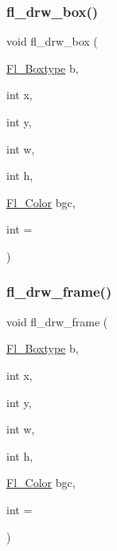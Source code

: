 \subsubsection{\texorpdfstring{fl\+\_\+drw\+\_\+box()}{fl\_drw\_box()}}
{\footnotesize\ttfamily void fl\+\_\+drw\+\_\+box (\begin{DoxyParamCaption}\item[{\hyperlink{_enumerations_8_h_ae48bf9070f8541de17829f54ccacc6bc}{Fl\+\_\+\+Boxtype}}]{b,  }\item[{int}]{x,  }\item[{int}]{y,  }\item[{int}]{w,  }\item[{int}]{h,  }\item[{\hyperlink{_enumerations_8_h_a8b762953646f8abee866061f1af78a6a}{Fl\+\_\+\+Color}}]{bgc,  }\item[{int}]{ = {} }\end{DoxyParamCaption})\hspace{0.3cm}{\ttfamily [inline]}}

\mbox{\label{forms_8_h_a370cc6166bbddeae7546604a21a2b06b}} 
\subsubsection{\texorpdfstring{fl\+\_\+drw\+\_\+frame()}{fl\_drw\_frame()}}
{\footnotesize\ttfamily void fl\+\_\+drw\+\_\+frame (\begin{DoxyParamCaption}\item[{\hyperlink{_enumerations_8_h_ae48bf9070f8541de17829f54ccacc6bc}{Fl\+\_\+\+Boxtype}}]{b,  }\item[{int}]{x,  }\item[{int}]{y,  }\item[{int}]{w,  }\item[{int}]{h,  }\item[{\hyperlink{_enumerations_8_h_a8b762953646f8abee866061f1af78a6a}{Fl\+\_\+\+Color}}]{bgc,  }\item[{int}]{ = {} }\end{DoxyParamCaption})\hspace{0.3cm}{\ttfamily [inline]}}

\mbox{\label{forms_8_h_a9e04f90932f0e52f138bad3d7d3a1df1}} 
